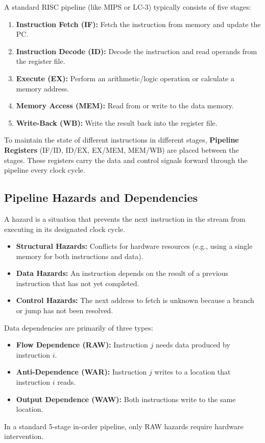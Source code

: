 \begin{definition}
A standard RISC pipeline (like MIPS or LC-3) typically consists of five stages:
\begin{enumerate}
    \item \textbf{Instruction Fetch (IF):} Fetch the instruction from memory and update the PC.
    \item \textbf{Instruction Decode (ID):} Decode the instruction and read operands from the register file.
    \item \textbf{Execute (EX):} Perform an arithmetic/logic operation or calculate a memory address.
    \item \textbf{Memory Access (MEM):} Read from or write to the data memory.
    \item \textbf{Write-Back (WB):} Write the result back into the register file.
\end{enumerate}
\end{definition}

\begin{important}
To maintain the state of different instructions in different stages, \textbf{Pipeline Registers} (IF/ID, ID/EX, EX/MEM, MEM/WB) are placed between the stages. These registers carry the data and control signals forward through the pipeline every clock cycle.
\end{important}

\subsection{Pipeline Hazards and Dependencies}

\begin{definition}
A hazard is a situation that prevents the next instruction in the stream from executing in its designated clock cycle.
\begin{itemize}
    \item \textbf{Structural Hazards:} Conflicts for hardware resources (e.g., using a single memory for both instructions and data).
    \item \textbf{Data Hazards:} An instruction depends on the result of a previous instruction that has not yet completed.
    \item \textbf{Control Hazards:} The next address to fetch is unknown because a branch or jump has not been resolved.
\end{itemize}
\end{definition}

\begin{definition}
Data dependencies are primarily of three types:
\begin{itemize}
    \item \textbf{Flow Dependence (RAW):} Instruction $j$ needs data produced by instruction $i$.
    \item \textbf{Anti-Dependence (WAR):} Instruction $j$ writes to a location that instruction $i$ reads.
    \item \textbf{Output Dependence (WAW):} Both instructions write to the same location.
\end{itemize}
In a standard 5-stage in-order pipeline, only RAW hazards require hardware intervention.
\end{definition}

